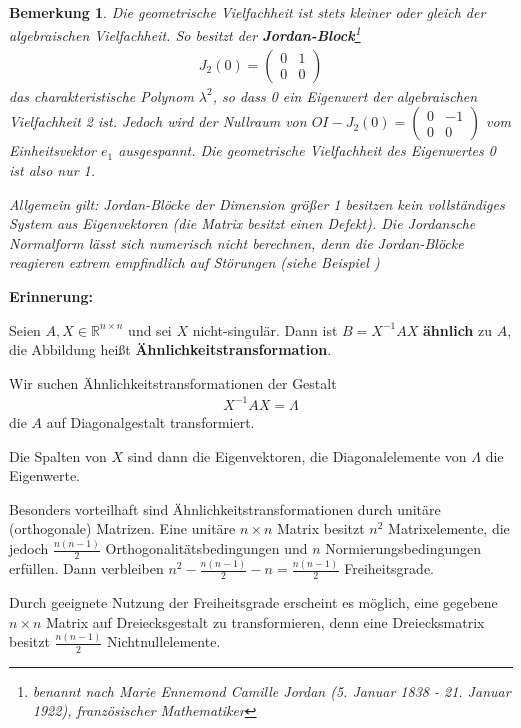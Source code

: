 \documentclass[%
a4paper,
11pt,		%
]
{scrartcl}
\theoremstyle{plain}
\theoremstyle{plain}
\theoremstyle{plain}
\newtheorem{mybem}[mydef]{Bemerkung}
\theoremstyle{plain}
\begin{document}
\begin{mybem}
Die geometrische Vielfachheit ist stets kleiner oder gleich der algebraischen Vielfachheit.
So besitzt der \textbf{Jordan-Block}\footnote{benannt nach Marie Ennemond Camille Jordan (5. Januar 1838 - 21. Januar 1922), französischer Mathematiker}
\begin{align*}
J_2(0) = 
\begin{pmatrix}
0 & 1\\
0 & 0
\end{pmatrix}
\end{align*}
das charakteristische Polynom $\lambda^2$, so dass 0 ein Eigenwert der algebraischen Vielfachheit 2 ist. Jedoch wird der Nullraum von $OI - J_2(0) = \begin{pmatrix}
0 & -1\\
0 & 0
\end{pmatrix}$
vom Einheitsvektor $e_1$ ausgespannt.
Die geometrische Vielfachheit des Eigenwertes 0 ist also nur 1.

Allgemein gilt: Jordan-Blöcke der Dimension größer 1 besitzen kein vollständiges System aus Eigenvektoren (die Matrix besitzt einen \textit{Defekt}).
Die Jordansche Normalform lässt sich numerisch nicht berechnen, denn die Jordan-Blöcke reagieren extrem empfindlich auf Störungen (siehe Beispiel )
\end{mybem}

\textbf{Erinnerung:}

Seien $A,X \in \mathbb{R}^{n \times n}$ und sei $X$ nicht-singulär. Dann ist $B=X^{-1}AX$ \textbf{ähnlich} zu $A$, die Abbildung heißt \textbf{Ähnlichkeitstransformation}.

Wir suchen Ähnlichkeitstransformationen der Gestalt
\begin{align*}
X^{-1}AX = \Lambda
\end{align*}
die $A$ auf Diagonalgestalt transformiert.

Die Spalten von $X$ sind dann die Eigenvektoren, die Diagonalelemente von $\Lambda$ die Eigenwerte.

Besonders vorteilhaft sind Ähnlichkeitstransformationen durch unitäre (orthogonale) Matrizen. Eine unitäre $n \times n$ Matrix besitzt $n^2$ Matrixelemente, die jedoch $\frac{n(n-1)}{2}$ Orthogonalitätsbedingungen und $n$ Normierungsbedingungen erfüllen.
Dann verbleiben $n^2 - \frac{n(n-1)}{2} -n = \frac{n(n-1)}{2}$ Freiheitsgrade. 

Durch geeignete Nutzung der Freiheitsgrade erscheint es möglich, eine gegebene $n \times n$ Matrix auf Dreiecksgestalt zu transformieren, denn eine Dreiecksmatrix besitzt $\frac{n(n-1)}{2}$ Nichtnullelemente.  
\end{document}
